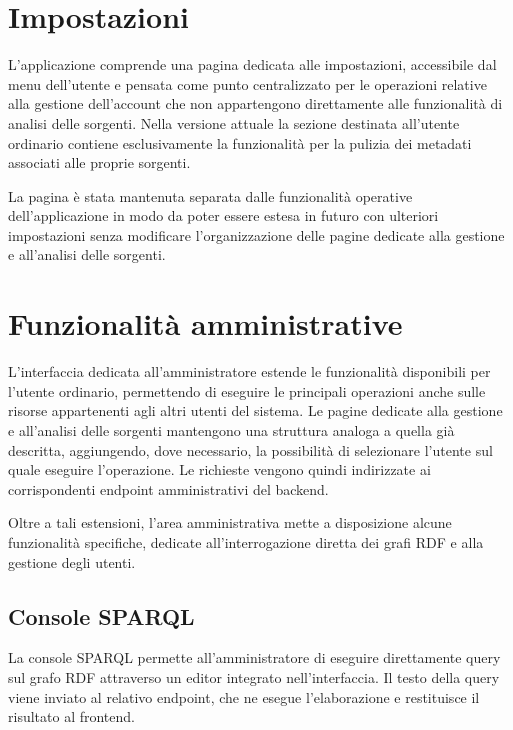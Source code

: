 \documentclass[13.6pt,a4paper]{report}
\begin{document}
\section{Impostazioni} %

L'applicazione comprende una pagina dedicata alle impostazioni, accessibile dal menu dell'utente e pensata come punto centralizzato per le operazioni relative alla gestione dell'account che non appartengono direttamente alle funzionalità di analisi delle sorgenti. Nella versione attuale la sezione destinata all'utente ordinario contiene esclusivamente la funzionalità per la pulizia dei metadati associati alle proprie sorgenti.

\noindent
La pagina è stata mantenuta separata dalle funzionalità operative dell'applicazione in modo da poter essere estesa in futuro con ulteriori impostazioni senza modificare l'organizzazione delle pagine dedicate alla gestione e all'analisi delle sorgenti.

\section{Funzionalità amministrative}

L'interfaccia dedicata all'amministratore estende le funzionalità disponibili per l'utente ordinario, permettendo di eseguire le principali operazioni anche sulle risorse appartenenti agli altri utenti del sistema. Le pagine dedicate alla gestione e all'analisi delle sorgenti mantengono una struttura analoga a quella già descritta, aggiungendo, dove necessario, la possibilità di selezionare l'utente sul quale eseguire l'operazione. Le richieste vengono quindi indirizzate ai corrispondenti endpoint amministrativi del backend.


\noindent
Oltre a tali estensioni, l'area amministrativa mette a disposizione alcune funzionalità specifiche, dedicate all'interrogazione diretta dei grafi RDF e alla gestione degli utenti.

\subsection{Console SPARQL}

La console SPARQL permette all'amministratore di eseguire direttamente query sul grafo RDF attraverso un editor integrato nell'interfaccia. Il testo della query viene inviato al relativo endpoint, che ne esegue l'elaborazione e restituisce il risultato al frontend.
\end{document}
